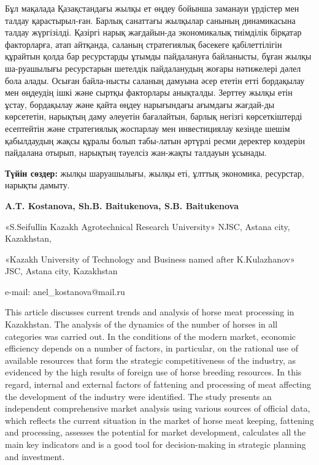 Бұл мақалада Қазақстандағы жылқы ет өңдеу бойынша заманауи үрдістер мен
талдау қарастырыл-ған. Барлық санаттағы жылқылар санының динамикасына
талдау жүргізілді. Қазіргі нарық жағдайын-да экономикалық тиімділік
бірқатар факторларға, атап айтқанда, саланың стратегиялық бәсекеге
қабілеттілігін құрайтын қолда бар ресурстарды ұтымды пайдалануға
байланысты, бұған жылқы ша-руашылығы ресурстарын шетелдік пайдаланудың
жоғары нәтижелері дәлел бола алады. Осыған байла-нысты саланың дамуына
әсер ететін етті бордақылау мен өңдеудің ішкі және сыртқы факторлары
анықталды. Зерттеу жылқы етін ұстау, бордақылау және қайта өңдеу
нарығындағы ағымдағы жағдай-ды көрсететін, нарықтың даму әлеуетін
бағалайтын, барлық негізгі көрсеткіштерді есептейтін және стратегиялық
жоспарлау мен инвестициялау кезінде шешім қабылдаудың жақсы құралы болып
табы-латын әртүрлі ресми деректер көздерін пайдалана отырып, нарықтың
тәуелсіз жан-жақты талдауын ұсынады.

{\bfseries Түйін сөздер:} жылқы шаруашылығы, жылқы еті, ұлттық экономика, ресурстар,
нарықты дамыту.

\begin{center}

{\bfseries A.T. Kostanova\envelope, Sh.B. Baitukenova, S.B.
Baitukenova}

«S.Seifullin Kazakh Agrotechnical Research University» NJSC, Astana city, Kazakhstan,

«Kazakh University of Technology and Business named after K.Kulazhanov» JSC, Astana city, Kazakhstan

e-mail: anel\_kostanova@mail.ru
\end{center}

This article discusses current trends and analysis of horse meat
processing in Kazakhstan. The analysis of the dynamics of the number of
horses in all categories was carried out. In the conditions of the
modern market, economic efficiency depends on a number of factors, in
particular, on the rational use of available resources that form the
strategic competitiveness of the industry, as evidenced by the high
results of foreign use of horse breeding resources. In this regard,
internal and external factors of fattening and processing of meat
affecting the development of the industry were identified. The study
presents an independent comprehensive market analysis using various
sources of official data, which reflects the current situation in the
market of horse meat keeping, fattening and processing, assesses the
potential for market development, calculates all the main key indicators
and is a good tool for decision-making in strategic planning and
investment.


